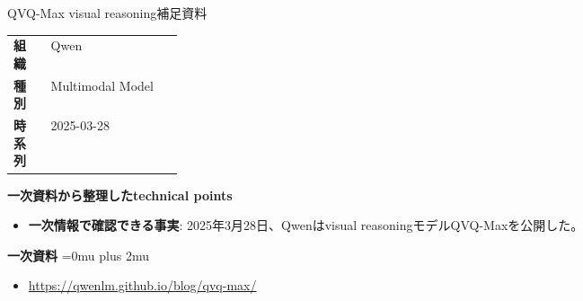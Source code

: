 \begin{technicalnote}{QVQ-Max visual reasoning}{補足資料}
\begingroup
\begin{tabularx}{\linewidth}{@{}>{\bfseries}p{0.22\linewidth}X@{}}
組織 & Qwen \\
種別 & Multimodal Model \\
時系列 & 2025-03-28 \\
\end{tabularx}
\smallskip
\begin{minipage}{\linewidth}
{\bfseries 一次資料から整理したtechnical points}
\begin{itemize}[leftmargin=1.5em,itemsep=0.35em]
\item \textbf{一次情報で確認できる事実}: 2025年3月28日、Qwenはvisual reasoningモデルQVQ-Maxを公開した。
\end{itemize}
\begin{samepage}
{\bfseries 一次資料}
\begingroup\sloppy
\Urlmuskip=0mu plus 2mu\relax
\begin{itemize}[leftmargin=1.5em,itemsep=0.25em]
\item {\scriptsize\url{https://qwenlm.github.io/blog/qvq-max/}}
\end{itemize}
\endgroup
\end{samepage}
\end{minipage}
\endgroup
\end{technicalnote}
\medskip
